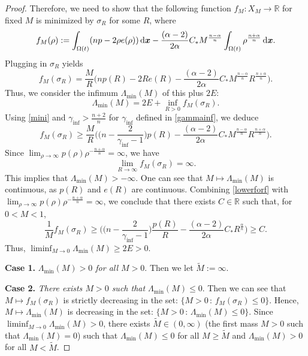 \documentclass[reqno,11pt]{amsart}
\numberwithin{equation}{section}
\theoremstyle{definition}
\def\dd{{\, \rm d}}
\begin{document}
\begin{proof}
Therefore, we need to show that the following function $f_M:X_M \to \mathbb{R}$ for fixed $M$ is minimized by $\sigma_{R}$ for some $R$, where
\[
f_M(\rho) := \int_{\Omega(t)}(np - 2 \rho e(\rho))\dd \boldsymbol{x} - \frac{(\alpha - 2)}{2\alpha} C_* M^\frac{n-\alpha}{n} \int_{\Omega(t)} \rho^\frac{n+\alpha}{n} \dd \boldsymbol{x}.
\]
Plugging in $\sigma_R$ yields
\begin{equation}\label{mini}
f_M(\sigma_{R}) = \frac{M}{R} \Big (np(R) - 2 R e(R) - \frac{(\alpha - 2)}{2\alpha} C_* M^\frac{n-\alpha}{n} R^\frac{n + \alpha}{n} \Big).
\end{equation}
Thus, we consider the infimum $ \Lambda_{\min}(M)$ of this plus $2E$:
\[
 \Lambda_{\min}(M) = 2E + \inf_{R > 0} f_M(\sigma_{R}).
\]
Using \eqref{mini} and $\gamma_{\inf} > \frac{n + 2}{n}$ for $\gamma_{\inf}$ 
defined in \eqref{gammainf}, we deduce 
\begin{equation}\label{lowerforf}
    f_M(\sigma_{R}) \geq \frac{M}{R} \Big (\big(n-\frac{2}{\gamma_{\inf} - 1}\big)p(R)
    - \frac{(\alpha - 2)}{2\alpha} C_* M^\frac{n-\alpha}{n} R^\frac{n + \alpha}{n} \Big).
\end{equation}
Since $\lim_{\rho\to\infty}p(\rho)\rho^{-\frac{n+\alpha}{n}} = \infty$, we have
\begin{equation*}
\lim_{R \to \infty} f_M(\sigma_{R}) = \infty.
\end{equation*}
This implies that $ \Lambda_{\min}(M) > - \infty$. 
One can see that $M \mapsto  \Lambda_{\min}(M)$ is continuous, 
as $p(R)$ and $e(R)$ are continuous. 
Combining \eqref{lowerforf} with $\lim_{\rho\to\infty}p(\rho)\rho^{-\frac{n+\alpha}{n}} = \infty$, 
we conclude that there exists $C \in \mathbb{R}$ such that, for $0<M<1$,
\[
    \frac{1}{M} f_M(\sigma_{R}) \geq \Big (\big(n-\frac{2}{\gamma_{\inf} - 1}\big)\frac{p(R)}{R} 
    - \frac{(\alpha - 2)}{2\alpha} C_* R^\frac{\alpha}{n} \Big) \geq C.
\]
Thus, $\liminf_{M \to 0} \Lambda_{\min}(M) \geq 2E > 0$.

\smallskip
\noindent
{\bf Case 1.} {\it $\Lambda_{\min}(M) > 0$ for all $M>0$}.
Then we let $\tilde{M} := \infty$.

\smallskip
\noindent
{\bf Case 2.} {\it There exists $M > 0$ such that $\Lambda_{\min}(M) \leq 0$}.
Then we can see that $M \mapsto  f_M(\sigma_{R})$ is strictly decreasing in the set:
$\{ M > 0 \, : \, f_M(\sigma_{R}) \leq 0\}$. 
Hence, $M \mapsto  \Lambda_{\min}(M)$ is decreasing in the 
set: $\{ M > 0 \, : \, \Lambda_{\min}(M) \leq 0\}$. 
Since $\liminf_{M \to 0} \Lambda_{\min}(M) > 0$, there exists $\tilde{M} \in (0,\infty)$ (the first mass $M>0$ such that $\Lambda_{\min}(M)=0$) such that $ \Lambda_{\min}(M) \leq 0 $ for all $M \geq \tilde{M}$ and $ \Lambda_{\min}(M) > 0$ for all $M < \tilde{M}$.


\end{proof}
\end{document}
